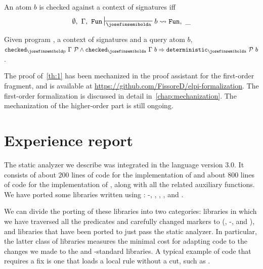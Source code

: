 \begin{definition} An atom $b$
is checked against a context of signatures \ctx iff 
\vspace{-.5pt}
$$\caC{\emptyset}{\ctx}{\detI}{b}{\detI}{\_}$$

\end{definition}




\begin{theorem} \label{th:1}
  Given program \prog, a context of signatures \ctx and a query atom $b$,
  $
  \isdetp~\ctx~\prog \land \isdetq~\ctx~b \Rightarrow \isdet~\prog~b
  $.
\end{theorem}

The proof of~\cref{th:1} has been mechanized in the \rocq proof assistant for
the first-order fragment, and is available at
\url{https://github.com/FissoreD/elpi-formalization}. The first-order
formalization is discussed in detail in~\cref{chap:mechanization}. The
mechanization of the higher-order part is still ongoing.

\section{Experience report}
\label{sec:det-exp-report}

The static analyzer we describe was integrated in the \elpi language
version 3.0. It
consists of
about $200$ lines of \ocaml code for the implementation of \mutExclAll and about $800$
lines of code for the implementation of \checkc, along with all the related
auxiliary functions.
We have  ported some \rocq libraries written using \elpi: \rocq-\elpi, \hb,
, \trocq, and .

We can divide the porting of these libraries into two categories: libraries in
which we have traversed all the predicates and carefully changed \epred markers
to \efunc (\elpi, \rocq-\elpi, and \hb), and libraries that have been ported to just pass the
static analyzer.
In particular, the latter class of libraries
measures the minimal cost for adapting code to the changes we made to
the \elpi and \rocq-\elpi standard libraries. A typical example of code 
that requires a fix is one that loads a local rule
without a cut, such as .



